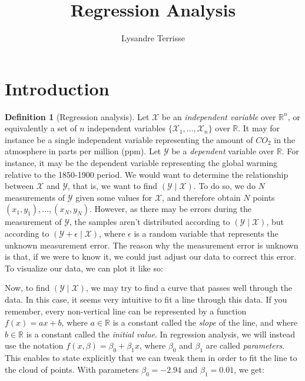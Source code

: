 \documentclass{article}
\title{Regression Analysis}
\author{Lysandre Terrisse}
\theoremstyle{definition}
\newtheorem{definition}{Definition}[section]
\theoremstyle{remark}
\theoremstyle{example}
\begin{document}
\maketitle


\section{Introduction}

\begin{definition}[Regression analysis]
		Let $\mathcal{X}$ be an \textit{independent variable} over $\mathbb{R}^n$, or equivalently a set of $n$ independent variables $\{\mathcal{X}_1, \dots, \mathcal{X}_n\}$ over $\mathbb{R}$. It may for instance be a single independent variable representing the amount of $CO_2$ in the atmosphere in parts per million (ppm). Let $\mathcal{Y}$ be a \textit{dependent} variable over $\mathbb{R}$. For instance, it may be the dependent variable representing the global warming relative to the 1850-1900 period. We would want to determine the relationship between $\mathcal{X}$ and $\mathcal{Y}$, that is, we want to find $(\mathcal{Y} \mid \mathcal{X})$. To do so, we do $N$ measurements of $\mathcal{Y}$ given some values for $\mathcal{X}$, and therefore obtain $N$ points $(x_1, y_1), \dots, (x_N, y_N)$. However, as there may be errors during the measurement of $\mathcal{Y}$, the samples aren't distributed according to $(\mathcal{Y} \mid \mathcal{X})$, but according to $(\mathcal{Y} + \epsilon \mid \mathcal{X})$, where $\epsilon$ is a random variable that represents the unknown measurement error. The reason why the measurement error is unknown is that, if we were to know it, we could just adjust our data to correct this error. To visualize our data, we can plot it like so:

\begin{figure}[h!]
		\centering
		\scalebox{0.9}{}
\end{figure}

		Now, to find $(\mathcal{Y} \mid \mathcal{X})$, we may try to find a curve that passes well through the data. In this case, it seems very intuitive to fit a line through this data. If you remember, every non-vertical line can be represented by a function $f(x) = ax + b$, where $a \in \mathbb{R}$ is a constant called the \textit{slope} of the line, and where $b \in \mathbb{R}$ is a constant called the \textit{initial value}. In regression analysis, we will instead use the notation $f(x, \beta) = \beta_0 + \beta_1 x$, where $\beta_0$ and $\beta_1$ are called \textit{parameters}. This enables to state explicitly that we can tweak them in order to fit the line to the cloud of points. With parameters $\beta_0 = -2.94$ and $\beta_1 = 0.01$, we get:


\end{definition}
\end{document}
